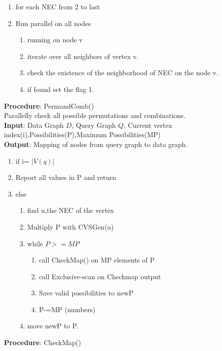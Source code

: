 \begin{breakablealgorithm}[H]
\begin{algorithmic}
\begin{enumerate}
\item for each NEC from 2 to last
\item Run parallel on all nodes
\begin{enumerate}
\item running on node v
\item iterate over all neighbors of vertex v.
\item \hspace{10mm}check the existence of the neighborhood of NEC on the node v.
\item \hspace{10mm}if found set the flag 1.
\end{enumerate}
\end{enumerate}
\end{algorithmic}
\textbf{Procedure}: PermandComb()\\
Parallelly check all possible permutations and combinations.\\
\textbf{Input}: Data Graph $D$, Query Graph $Q$, Current vertex index(i),Possibilities(P),Maximum Possibilities(MP)\\
\textbf{Output}: Mapping of nodes from query graph to data graph.\\
\begin{algorithmic}
\item \begin{enumerate}
\item if i= $|V(q)|$
\item \hspace{10mm}Report all values in P and return
\item else
 \begin{enumerate}
\item find u,the NEC of the vertex
\item Multiply P with CVSGen(u)
\item while $P >= MP$
 \begin{enumerate}
\item call CheckMap() on MP elements of P
\item call Exclusive-scan on Checkmap output
\item Save valid possibilities to newP 
\item P-=MP (numbers)
\end{enumerate}
\item move newP to P.
\end{enumerate}
\end{enumerate}
\end{algorithmic}
\textbf{Procedure}: CheckMap()\\

\end{breakablealgorithm}

